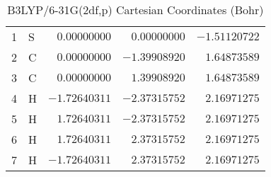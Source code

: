 \documentclass[10pt,oneside]{article}
\begin{document}
\begin{table}[h]
\centering
\caption{B3LYP/6-31G(2df,p) Cartesian Coordinates (Bohr)}
\begin{tabular}{llrrr}
\toprule
1  & S  & $ 0.00000000$ & $ 0.00000000$ & $-1.51120722$ \\
2  & C  & $ 0.00000000$ & $-1.39908920$ & $ 1.64873589$ \\
3  & C  & $ 0.00000000$ & $ 1.39908920$ & $ 1.64873589$ \\
4  & H  & $-1.72640311$ & $-2.37315752$ & $ 2.16971275$ \\
5  & H  & $ 1.72640311$ & $-2.37315752$ & $ 2.16971275$ \\
6  & H  & $ 1.72640311$ & $ 2.37315752$ & $ 2.16971275$ \\
7  & H  & $-1.72640311$ & $ 2.37315752$ & $ 2.16971275$ \\
\bottomrule
\end{tabular}
\end{table}
\end{document}
